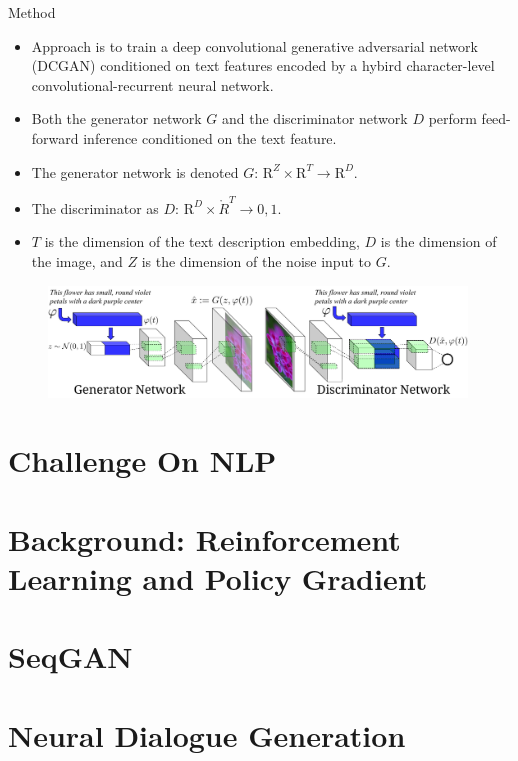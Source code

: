 \documentclass[10pt]{beamer}
\begin{document}
	\begin{frame}{Method}
		\begin{itemize}
			\item Approach is to train a deep convolutional generative adversarial network (DCGAN) conditioned on text features encoded by a hybird character-level convolutional-recurrent neural network.
			\item Both the generator network $G$ and the discriminator network $D$ perform feed-forward inference conditioned on the text feature.
			\item The generator network is denoted $G$: $\mathrm{R}^Z\times\mathrm{R}^T\rightarrow\mathrm{R}^D$.
			\item The discriminator as $D$: $\mathrm{R}^D\times\mathring{R}^T\rightarrow{0,1}$.
			\item $T$ is the dimension of the text description embedding, $D$ is the dimension of the image, and $Z$ is the dimension of the noise input to $G$.
		\end{itemize}
		\begin{figure}
			\includegraphics[width=30em]{figures/image-synthesis-structure.png}
		\end{figure}
	\end{frame}
	
	
	\part{Challenge On NLP}
	\part{Background: Reinforcement Learning and Policy Gradient}
	\part{SeqGAN}
	\part{Neural Dialogue Generation}
\end{document}
